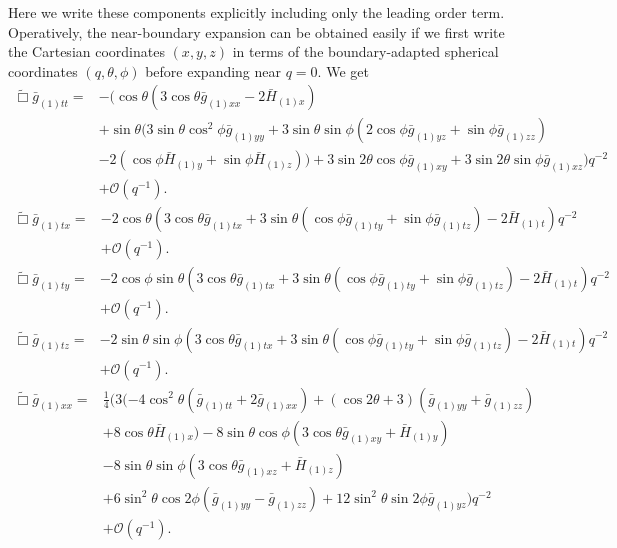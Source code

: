 \documentclass[12pt]{iopart} %
\begin{document}
Here we write these components explicitly including only the leading order term. Operatively, the near-boundary expansion can be obtained easily if we first write the Cartesian coordinates $(x,y,z)$ in terms of the boundary-adapted spherical coordinates $(q,\theta,\phi)$ before expanding near $q=0$. We get
\begin{eqnarray}\label{eqn:efett}
\tilde{\Box}\bar{g}_{(1)tt}=&-(\cos \theta (3 \cos \theta  \bar{g}_{(1)xx}-2 \bar{H}_{(1)x}) \nonumber \\
&+\sin\theta (3 \sin \theta \cos^2\phi \bar{g}_{(1) yy}+3
   \sin \theta  \sin \phi (2 \cos \phi  \bar{g}_{(1) yz}+\sin\phi
   \bar{g}_{(1) zz}) \nonumber \\
   &-2 (\cos \phi \bar{H}_{(1) y}+\sin\phi
   \bar{H}_{(1) z}))+3 \sin 2 \theta  \cos \phi \bar{g}_{(1) xy}+3
   \sin 2 \theta  \sin \phi \bar{g}_{(1) xz})q^{-2} \nonumber \\
&+\mathcal{O}(q^{-1}).
\end{eqnarray}
\begin{eqnarray}\label{eqn:efetx}
\tilde{\Box}\bar{g}_{(1)tx}=&-2 \cos \theta (3 \cos\theta \bar{g}_{(1) tx}+3 \sin \theta
   (\cos \phi  \bar{g}_{(1) ty}+\sin \phi  \bar{g}_{(1)tz})-2
   \bar{H}_{(1) t})    q^{-2} \nonumber \\
&+\mathcal{O}(q^{-1}).
\end{eqnarray}
\begin{eqnarray}\label{eqn:efety}
\tilde{\Box}\bar{g}_{(1)ty}=&-2 \cos \phi \sin\theta (3 \cos\theta \bar{g}_{(1) tx}+3 \sin \theta
   (\cos \phi  \bar{g}_{(1) ty}+\sin \phi  \bar{g}_{(1)tz})-2
   \bar{H}_{(1) t})    q^{-2} \nonumber \\
&+\mathcal{O}(q^{-1}).
\end{eqnarray}
\begin{eqnarray}\label{eqn:efetz}
\tilde{\Box}\bar{g}_{(1)tz}=&-2 \sin \theta \sin\phi (3 \cos\theta \bar{g}_{(1) tx}+3 \sin \theta
   (\cos \phi \bar{g}_{(1) ty}+\sin \phi  \bar{g}_{(1)tz})-2
   \bar{H}_{(1) t})    q^{-2} \nonumber \\
&+\mathcal{O}(q^{-1}).
\end{eqnarray}
\begin{eqnarray}\label{eqn:efexx}
\tilde{\Box}\bar{g}_{(1)xx}=&\frac{1}{4} (3 (-4 \cos ^2\theta (\bar{g}_{(1) tt}+2 \bar{g}_{(1)
   xx})+(\cos 2 \theta +3) (\bar{g}_{(1) yy}+\bar{g}_{(1)
zz}) \nonumber \\
&+8 \cos \theta  \bar{H}_{(1) x})-8 \sin \theta  \cos \phi 
   (3 \cos \theta  \bar{g}_{(1)xy}+\bar{H}_{(1) y}) \nonumber \\
   &-8 \sin\theta \sin\phi (3 \cos\theta \bar{g}_{(1) xz}+\bar{H}_{(1) z}) \nonumber \\
   &+6 \sin^2\theta  \cos 2 \phi  (\bar{g}_{(1)yy}-\bar{g}_{(1)zz})+12
   \sin^2\theta  \sin 2 \phi  \bar{g}_{(1) yz})    q^{-2} \nonumber \\
&+\mathcal{O}(q^{-1}).
\end{eqnarray}
\end{document}

